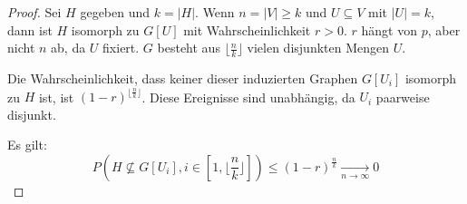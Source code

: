 \begin{proof}
    Sei $ H $ gegeben und $ k = |H| $.
    Wenn $ n = |V| \geq k $ und $ U \subseteq V $ mit $ |U| = k $, dann ist $ H $ isomorph zu $ G[U] $ mit Wahrscheinlichkeit $ r > 0 $.
    $ r $ hängt von $ p $, aber nicht $ n $ ab, da $ U $ fixiert.
    $ G $ besteht aus $ \lfloor \frac{n}{k} \rfloor $ vielen disjunkten Mengen $ U $.

    Die Wahrscheinlichkeit, dass keiner dieser induzierten Graphen $ G[U_i] $ isomorph zu $ H $ ist, ist $ (1 - r)^{\lfloor \frac{n}{k} \rfloor} $.
    Diese Ereignisse sind unabhängig, da $ U_i $ paarweise disjunkt.

    Es gilt:
    \begin{equation*}
        P(H \not \subseteq G[U_i], i \in [1, \lfloor \frac{n}{k} \rfloor]) \leq (1 - r)^{\frac{n}{k}} \xrightarrow[n \to \infty]{} 0
    \end{equation*}
\end{proof}
